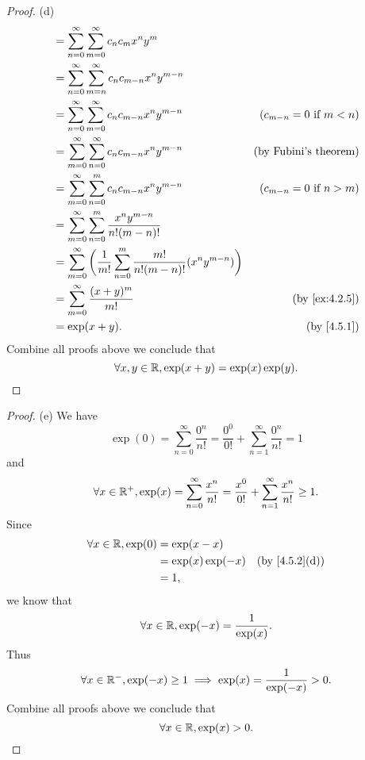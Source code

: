 \begin{proof}{(d)}
\begin{align*}
     & = \sum_{n = 0}^\infty \sum_{m = 0}^\infty c_n c_m x^n y^m                                                                                \\
     & = \sum_{n = 0}^\infty \sum_{m = n}^\infty c_n c_{m - n} x^n y^{m - n}                                                                    \\
     & = \sum_{n = 0}^\infty \sum_{m = 0}^\infty c_n c_{m - n} x^n y^{m - n}                                & (c_{m - n} = 0 \text{ if } m < n) \\
     & = \sum_{m = 0}^\infty \sum_{n = 0}^\infty c_n c_{m - n} x^n y^{m - n}                                & \text{(by Fubini's theorem)}      \\
     & = \sum_{m = 0}^\infty \sum_{n = 0}^m c_n c_{m - n} x^n y^{m - n}                                     & (c_{m - n} = 0 \text{ if } n > m) \\
     & = \sum_{m = 0}^\infty \sum_{n = 0}^m \frac{x^n y^{m - n}}{n! (m - n)!}                                                                   \\
     & = \sum_{m = 0}^\infty \bigg(\frac{1}{m!} \sum_{n = 0}^m \frac{m!}{n! (m - n)!} (x^n y^{m - n})\bigg)                                     \\
     & = \sum_{m = 0}^\infty \frac{(x + y)^m}{m!}                                                           & \text{(by \cref{ex:4.2.5})}       \\
     & = \exp(x + y).                                                                                       & \text{(by \cref{4.5.1})}
  \end{align*}
  Combine all proofs above we conclude that
  \[
    \forall x, y \in \mathbb{R}, \exp(x + y) = \exp(x) \exp(y).
  \]
\end{proof}

\begin{proof}{(e)}
  We have
  \[
    \exp(0) = \sum_{n = 0}^\infty \frac{0^n}{n!} = \frac{0^0}{0!} + \sum_{n = 1}^\infty \frac{0^n}{n!} = 1
  \]
  and
  \[
    \forall x \in \mathbb{R}^+, \exp(x) = \sum_{n = 0}^\infty \frac{x^n}{n!} = \frac{x^0}{0!} + \sum_{n = 1}^\infty \frac{x^n}{n!} \geq 1.
  \]
  Since
  \begin{align*}
    \forall x \in \R, \exp(0) & = \exp(x - x)                                    \\
                              & = \exp(x) \exp(-x) & \text{(by \cref{4.5.2}(d))} \\
                              & = 1,
  \end{align*}
  we know that
  \[
    \forall x \in \mathbb{R}, \exp(-x) = \frac{1}{\exp(x)}.
  \]
  Thus
  \[
    \forall x \in \mathbb{R}^-, \exp(-x) \geq 1 \implies \exp(x) = \frac{1}{\exp(-x)} > 0.
  \]
  Combine all proofs above we conclude that
  \[
    \forall x \in \mathbb{R}, \exp(x) > 0.
  \]
\end{proof}

